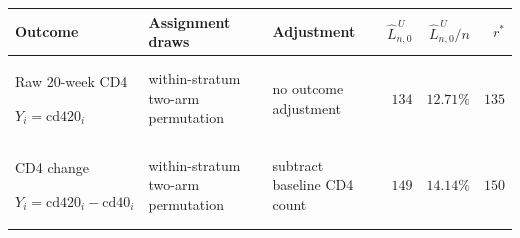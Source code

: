 \setlength{\tabcolsep}{6pt}
\renewcommand{\arraystretch}{1.18}
\begin{tabular}{p{3.5cm} p{3.3cm} p{3.4cm} r r r}
\toprule
Outcome & Assignment draws & Adjustment & $\widehat L_{n,0}^{\,U}$ & $\widehat L_{n,0}^{\,U}/n$ & $r^{\ast}$ \\
\midrule
Raw 20-week CD4 \par $Y_i=\mathrm{cd420}_i$ & within-stratum two-arm permutation & no outcome adjustment & $134$ & $12.71\%$ & $135$ \\
CD4 change \par $Y_i=\mathrm{cd420}_i-\mathrm{cd40}_i$ & within-stratum two-arm permutation & subtract baseline CD4 count & $149$ & $14.14\%$ & $150$ \\
\bottomrule
\end{tabular}
